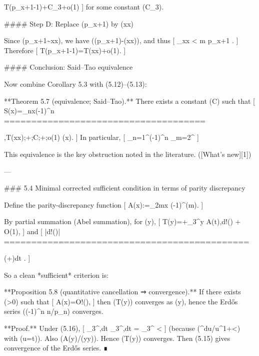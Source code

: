 T(p_{x+1}-1)+C_3+o(1)
]
for some constant (C_3).

#### Step D: Replace (p_{x+1}) by (x\log x)

Since (p_{x+1}\sim x\log x), we have (\log\log(p_{x+1})-\log\log(x\log x)), and thus
[
\sum_{x\log x < m \le p_{x+1}} 
.
]
Therefore
[
T(p_{x+1}-1)=T(x\log x)+o(1).
]

#### Conclusion: Said–Tao equivalence

Now combine Corollary 5.3 with (5.12)–(5.13):

**Theorem 5.7 (equivalence; Said–Tao).**
There exists a constant (C\in{}) such that
[
S(x)=\sum_{n\le x}(-1)^n
=====================================

,T(x\log x);+;C;+;o(1)
\qquad (x\to\infty).
]
In particular,
[
\sum_{n=1}^\infty (-1)^n 
\quad\Longleftrightarrow\quad
\sum_{m=2}^\infty {} 
]

This equivalence is the key obstruction noted in the literature. ([What's new][1])

---

### 5.4 Minimal corrected sufficient condition in terms of parity discrepancy

Define the parity-discrepancy function
[
A(x):=\sum_{2\le m\le x} (-1)^{\pi(m)}.
]

By partial summation (Abel summation), for (y),
[
T(y)=+\int_{3}^{y} A(t),d!\left(\right) + O(1),
]
and
[
\left|d!\left(\right)\right|
=============================================

\left(+\right)dt
\asymp {}.
]

So a clean *sufficient* criterion is:

**Proposition 5.8 (quantitative cancellation ⇒ convergence).**
If there exists (\varepsilon>0) such that
[
A(x)=O!\left(\right),
]
then (T(y)) converges as (y\to\infty), hence the Erdős series (\sum (-1)^n n/p_n) converges.

**Proof.** Under (5.16),
[
\int_{3}^{\infty},dt
\ll \int_{3}^{\infty},dt
= \int_{3}^{\infty}
<\infty
]
(because (\int^\infty du/u^{1+\varepsilon}<\infty) with (u=\log\log t)). Also (A(y)/(y\log y)). Hence (T(y)) converges. Then (5.15) gives convergence of the Erdős series. ∎

